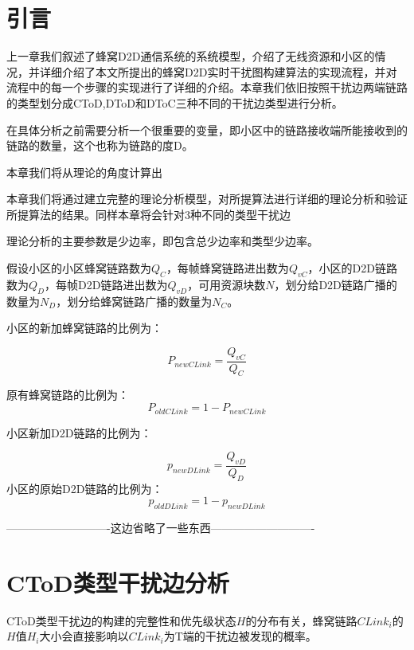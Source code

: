 \documentclass[figurelist,tablelist,algorithmlist,nomlist,masters]{seuthesix}
\begin{document}
	\section{引言}
	上一章我们叙述了蜂窝D2D通信系统的系统模型，介绍了无线资源和小区的情况，并详细介绍了本文所提出的蜂窝D2D实时干扰图构建算法的实现流程，并对流程中的每一个步骤的实现进行了详细的介绍。本章我们依旧按照干扰边两端链路的类型划分成CToD,DToD和DToC三种不同的干扰边类型进行分析。
	
	在具体分析之前需要分析一个很重要的变量，即小区中的链路接收端所能接收到的链路的数量，这个也称为链路的度D。
	
	
	本章我们将从理论的角度计算出
	
	本章我们将通过建立完整的理论分析模型，对所提算法进行详细的理论分析和验证所提算法的结果。同样本章将会针对3种不同的类型干扰边
	
	理论分析的主要参数是少边率，即包含总少边率和类型少边率。
	
	假设小区的小区蜂窝链路数为$Q_C$，每帧蜂窝链路进出数为$Q_{vC}$，小区的D2D链路数为$Q_D$，每帧D2D链路进出数为$Q_{vD}$，可用资源块数$N$，划分给D2D链路广播的数量为$N_D$，划分给蜂窝链路广播的数量为$N_C$。
	
	
	
	小区的新加蜂窝链路的比例为：
	
	\begin{equation}\label{eq3.1}
	{P_{newCLink}} = \frac{{Q_{vC}}}{{Q_C}}
	\end{equation}
	
	原有蜂窝链路的比例为：
	\begin{equation}\label{eq3.2}
	{P_{oldCLink}} = 1 - {P_{newCLink}}
	\end{equation}
	
	小区新加D2D链路的比例为：
	
	\begin{equation}\label{eq3.3}
	{p_{newDLink}} = \frac{{Q_{vD}}}{{Q_D}}
	\end{equation}
	小区的原始D2D链路的比例为：
	\begin{equation}\label{eq3.4}
	{p_{oldDLink}} = 1 - {p_{newDLink}}
	\end{equation}
	
	----------------------------这边省略了一些东西----------------------------
	
	\section{CToD类型干扰边分析}
	CToD类型干扰边的构建的完整性和优先级状态${H}$的分布有关，蜂窝链路${CLink_i}$的${H}$值${H_i}$大小会直接影响以${CLink_i}$为T端的干扰边被发现的概率。
	
\end{document}
